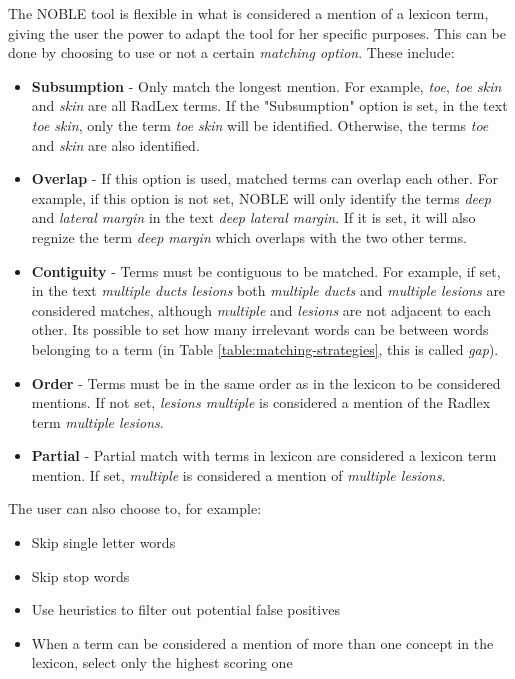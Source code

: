 The NOBLE tool is flexible in what is considered a mention of a lexicon term, giving the user the power to adapt the tool for her specific purposes. This can be done by choosing to use or not a certain \textit{matching option}. These include:

\begin{itemize}

\item \textbf{Subsumption} - Only match the longest mention. For example, \textit{toe}, \textit{toe skin} and \textit{skin} are all RadLex terms. If the "Subsumption" option is set, in the text \textit{toe skin}, only the term \textit{toe skin} will be identified. Otherwise, the terms \textit{toe} and \textit{skin} are also identified.

\item \textbf{Overlap} - If this option is used, matched terms can overlap each other. For example, if this option is not set, NOBLE will only identify the terms \textit{deep} and \textit{lateral margin} in the text \textit{deep lateral margin}. If it is set, it will also regnize the term \textit{deep margin} which overlaps with the two other terms.

\item \textbf{Contiguity} - Terms must be contiguous to be matched. For example, if set, in the text \textit{multiple ducts lesions} both \textit{multiple ducts} and \textit{multiple lesions} are considered matches, although \textit{multiple} and \textit{lesions} are not adjacent to each other. Its possible to set how many irrelevant words can be between words belonging to a term (in Table \ref{table:matching-strategies}, this is called \textit{gap}).

\item \textbf{Order} - Terms must be in the same order as in the lexicon to be considered mentions. If not set, \textit{lesions multiple} is considered a mention of the Radlex term \textit{multiple lesions}.

\item \textbf{Partial} - Partial match with terms in lexicon are considered a lexicon term mention. If set, \textit{multiple} is considered a mention of \textit{multiple lesions}.

\end{itemize}

The user can also choose to, for example:

\begin{itemize}
\item Skip single letter words
\item Skip stop words
\item Use heuristics to filter out potential false positives
\item When a term can be considered a mention of more than one concept in the lexicon,  select only the highest scoring one
\end{itemize}

